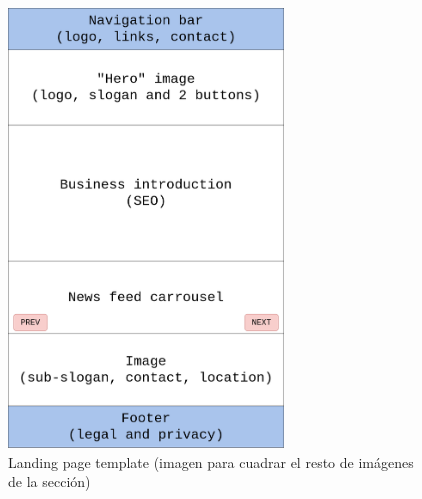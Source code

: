 \documentclass[a4paper]{article}
\begin{document}
\begin{figure}[H]
    \centering
    \includegraphics[width=0.65\textwidth]{images/landing-page-template.png}
    \captionsetup{width=0.6\textwidth}
    \caption{Landing page template (imagen para cuadrar el resto de imágenes de la sección)}
\end{figure}
\end{document}
